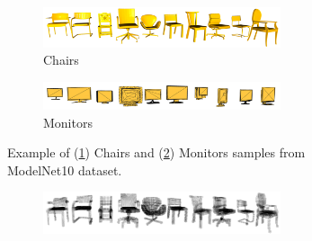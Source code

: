 \begin{figure}[h]
    \renewcommand\thefigure{\arabic{figure}.}
    \begin{center}
        \begin{subfigure}{0.45\textwidth}
            \centering
             \begin{subfigure}[b]{\textwidth}
                \renewcommand\thesubfigure{\alph{subfigure}.I}
                 \centering
                 \includegraphics[width=\textwidth]{resources/chairs.png}
                 \caption{Chairs}
                 \label{fig:chairs}
             \end{subfigure}
             \begin{subfigure}[b]{\textwidth}
                \addtocounter{subfigure}{-1}
                \renewcommand\thesubfigure{\alph{subfigure}.II}
                 \centering
                 \includegraphics[width=\textwidth]{resources/monitor.png}
                 \caption{Monitors}
                 \label{fig:monitors}
             \end{subfigure}
            \addtocounter{subfigure}{-1}
            \caption{Example of (\ref{fig:chairs}) Chairs and (\ref{fig:monitors}) Monitors samples from \mbox{ModelNet10} dataset.}
            \label{fig:CADModels}
            \addtocounter{subfigure}{+1}
        \end{subfigure}
        \begin{subfigure}{0.10\textwidth}
        \end{subfigure}
        \begin{subfigure}{0.45\textwidth}
            \centering
             \begin{subfigure}[b]{\textwidth}
                \addtocounter{subfigure}{-1}
                \renewcommand\thesubfigure{\alph{subfigure}.I}
                 \centering
                 \includegraphics[width=\textwidth]{resources/chairs_voxels.png}

\end{subfigure}
\end{subfigure}
\end{center}
\end{figure}
